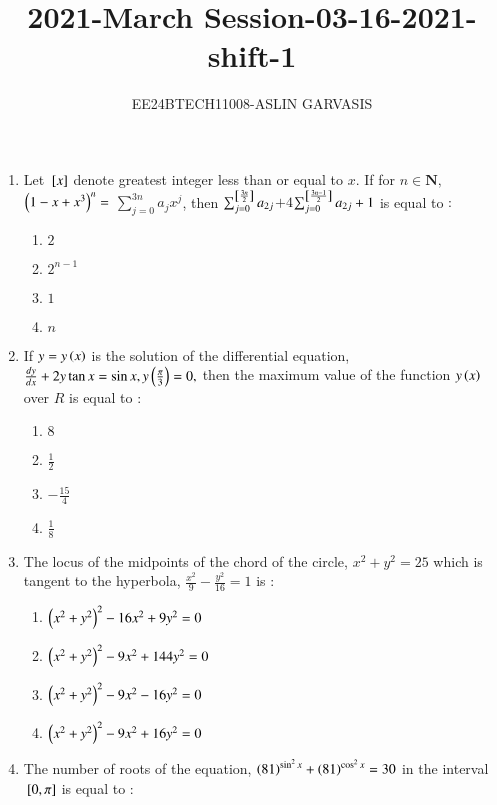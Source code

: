 \documentclass[journal,12pt,twocolumn]{IEEEtran}
\theoremstyle{remark}
\begin{document}

\vspace{3cm}
\title{2021-March Session-03-16-2021-shift-1}
\author{EE24BTECH11008-ASLIN GARVASIS}
\maketitle
\begin{enumerate}[start=16]
    \item Let ${}\left[x\right]$ denote greatest integer less than or equal to $x.$ If for $n \in \textbf{N},$ $\left(1-x+x^3\right)^n=$ $\sum_{j=0}^{3n}a_jx^j$, then $\sum_{j=0}^{{}\left[\frac{3n}{2}\right]}a_{2j}$$+4$$\sum_{j=0}^{{}\left[\frac{3n-1}{2}\right]}a_{2j}+1$ is equal to $:$\\
    \begin{enumerate}
        \item $2$
        \item $2^{n-1}$
        \item $1$
        \item $n$
    \end{enumerate}
    \item If $y=y\left(x\right)$ is the solution of the differential equation, $\frac{dy}{dx}+2y\tan x=\sin x,y\left(\frac{\pi}{3}\right)=0,$ then the maximum value of the function $y\left(x\right)$ over $R$ is equal to $:$\\
    \begin{enumerate}
        \item $8$
        \item $\frac{1}{2}$
        \item $-\frac{15}{4}$
        \item $\frac{1}{8}$
    \end{enumerate}
    \item The locus of the midpoints of the chord of the circle, $x^2+y^2=25$ which is tangent to the hyperbola, $\frac{x^2}{9}-\frac{y^2}{16}=1$ is $:$\\
    \begin{enumerate}
        \item $\left(x^2+y^2\right)^2-16x^2+9y^2=0$
        \item $\left(x^2+y^2\right)^2-9x^2+144y^2=0$
        \item $\left(x^2+y^2\right)^2-9x^2-16y^2=0$
        \item $\left(x^2+y^2\right)^2-9x^2+16y^2=0$
    \end{enumerate}
    \item The number of roots of the equation, $\left(81\right)^{\sin^2x} +\left(81\right)^{\cos^2x} =30$ in the interval ${}\left[0, \pi\right]$ is equal to $:$\\


\end{enumerate}
\end{document}
